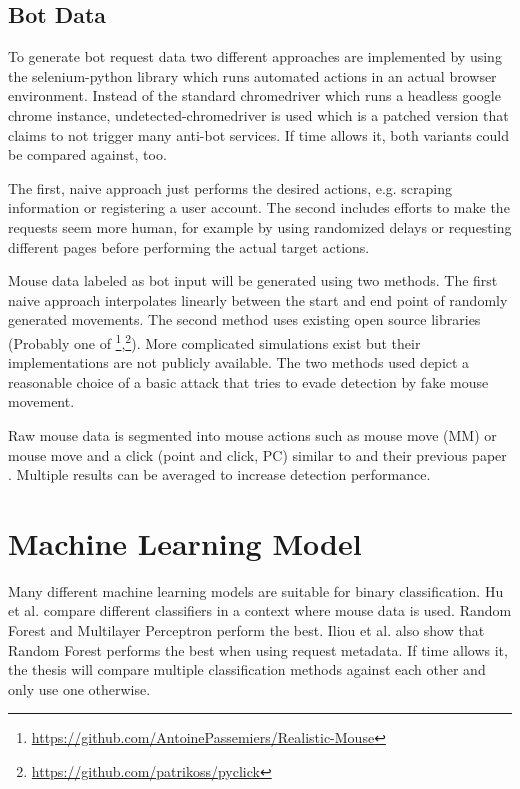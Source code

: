 \documentclass[
    fontsize=12pt,
    headings=small,
    parskip=half,           %
    bibliography=totoc,
    numbers=noenddot,       %
    open=any,               %
    final                   %
    ]{scrreprt}
\begin{document}
\subsection{Bot Data}

To generate bot request data two different approaches are implemented by using the selenium-python \cite{SELENIUMPYTHON} library which runs automated actions in an actual browser environment. Instead of the standard chromedriver which runs a headless google chrome instance, undetected-chromedriver \cite{UNDETECTEDCHROMEDRIVER} is used which is a patched version that claims to not trigger many anti-bot services. If time allows it, both variants could be compared against, too.

The first, naive approach just performs the desired actions, e.g. scraping information or registering a user account. The second includes efforts to make the requests seem more human, for example by using randomized delays or requesting different pages before performing the actual target actions.

Mouse data labeled as bot input will be generated using two methods. The first naive approach interpolates linearly between the start and end point of randomly generated movements. The second method uses existing open source libraries (Probably one of \footnote{\url{https://github.com/AntoinePassemiers/Realistic-Mouse}},\footnote{\url{https://github.com/patrikoss/pyclick}}). More complicated simulations exist but their implementations are not publicly available. \cite{8275816} \cite{Nazar2003} The two methods used depict a reasonable choice of a basic attack that tries to evade detection by fake mouse movement.

Raw mouse data is segmented into mouse actions such as mouse move (MM) or mouse move and a click (point and click, PC) similar to \cite{9111596} and their previous paper \cite{DBLP:journals/corr/abs-1810-04668}. Multiple results can be averaged to increase detection performance.


\section{Machine Learning Model}

Many different machine learning models are suitable for binary classification. Hu et al. \cite{8275816} compare different classifiers in a context where mouse data is used. Random Forest and Multilayer Perceptron perform the best.
Iliou et al. \cite{10.1145/3339252.3339267} also show that Random Forest performs the best when using request metadata.
If time allows it, the thesis will compare multiple classification methods against each other and only use one otherwise.
\end{document}

